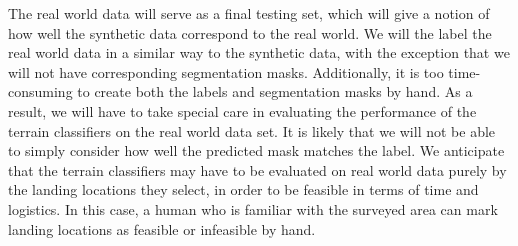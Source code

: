 The real world data will serve as a final testing set, which will give a notion of how well
the synthetic data correspond to the real world.
We will the label the real world data in a similar way to the synthetic data, with the exception
that we will not have corresponding segmentation masks.
Additionally, it is too time-consuming to create both the labels
and segmentation masks by hand.
As a result, we will have to take special care in evaluating the performance of the terrain
classifiers on the real world data set.
It is likely that we will not be able to simply consider how well the predicted mask
matches the label.
We anticipate that the terrain classifiers may have to be evaluated on real world data purely by
the landing locations they select, in order to be feasible in terms of time and logistics.
In this case, a human who is familiar with the surveyed area can mark landing locations
as feasible or infeasible by hand.